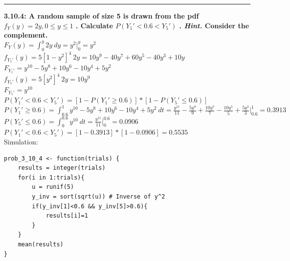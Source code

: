 \documentclass[11pt]{article}
\newcommand\question[2]{\vspace{.25in}\hrule\textbf{#1: #2}\vspace{.5em}\vspace{.10in}}
\begin{document}
\raggedright
\newcommand\NAME{Jonathan Lopez}  %
\newcommand\HWNUM{4}              %



\question{3.10.4}
{A random sample of size 5 is drawn from the pdf
    $f_{Y}(y)=2y, 0 \leq y \leq 1$
. Calculate
$P(Y_{1}' < 0.6 < Y_{5}')$
. \emph{Hint.} Consider the complement.}
\\
$
F_{Y}(y) 
=
\int_{0}^{y} 2y\ dy
=
y^{2} \big |_{0}^{y}
=
y^{2}
$
\\
$
f_{Y_{1}'}(y)
=
5[1-y^{2}]^{4} \ 2y
=
10y^{9} - 40y^{7} + 60y^{5} - 40y^{3} + 10y
$
\\
$
F_{Y_{1}'}
=
y^{10} - 5y^{8} + 10y^{6} - 10y^{4} + 5y^{2}
$
\\
$
f_{Y_{5}'}(y)
=
5[y^{2}]^{4} \ 2y
=
10y^9
$
\\
$
F_{Y_{5}'}
=
y^{10}
$
\\
$
P(Y_{1}' < 0.6 < Y_{5}')
=
[1-P(Y_{1}' \geq 0.6)] * [1-P(Y_{5}' \leq 0.6)]
$
\\
$
P(Y_{1}' \geq 0.6) 
=
\int_{0.6}^{1} y^{10} - 5y^{8} + 10y^{6} - 10y^{4} + 5y^{2} \ dt
=
\frac{y^{11}}{11} - 
\frac{5y^{9}}{9} + 
\frac{10y^{7}}{7} - 
\frac{10y^{5}}{5} + 
\frac{5y^{3}}{3}
\big |_{0.6}^{1}
=
0.3913
$
\\
$
P(Y_{5}' \leq 0.6)
=
\int_{0}^{0.6} y^{10} \ dt
=
\frac{y^{11}}{11} \big |_{0}^{0.6}
=
0.0906
$
\\
$
P(Y_{1}' < 0.6 < Y_{5}')
=
[1- 0.3913] * [1-0.0906]
=
0.5535
$
\\
Simulation:
\\
\begin{lstlisting}
prob_3_10_4 <- function(trials) {
    results = integer(trials)
    for(i in 1:trials){
        u = runif(5)
        y_inv = sort(sqrt(u)) # Inverse of y^2
        if(y_inv[1]<0.6 && y_inv[5]>0.6){
            results[i]=1
        }
    }
    mean(results)
}
\end{lstlisting}
\end{document}
